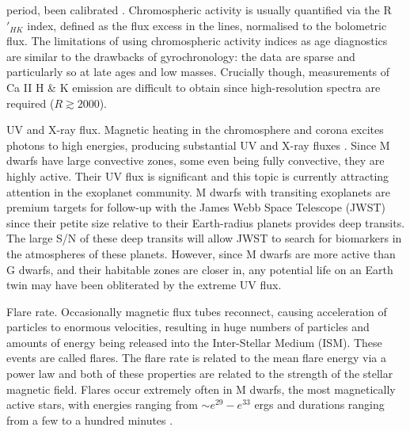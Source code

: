 \begin{itemize}
{{period, been calibrated \citep[\eg][]{Soderblom1991, Donahue1993,
Lachaume1999, Mamajek2008}.
Chromospheric activity is usually quantified via the R$\prime_{HK}$ index,
defined as the flux excess in the lines, normalised to the bolometric flux.
The limitations of using chromospheric activity indices as age diagnostics are
similar to the drawbacks of gyrochronology: the data are sparse and
particularly so at late ages and low masses.
Crucially though, measurements of Ca II H \& K emission are difficult to
obtain since high-resolution spectra are required ($R\gtrsim2000$).
}
\item{UV and X-ray flux.}
Magnetic heating in the chromosphere and corona excites photons to high
energies, producing substantial UV and X-ray fluxes
\citep[\eg][]{Pallavicini1981}.
Since M dwarfs have large convective zones, some even being fully convective,
they are highly active.
Their UV flux is significant and this topic is currently attracting attention
in the exoplanet community.
M dwarfs with transiting exoplanets are premium targets for follow-up with the
James Webb Space Telescope (JWST) since their petite size relative to their
Earth-radius planets provides deep transits.
The large S/N of these deep transits will allow JWST to search for biomarkers
in the atmospheres of these planets.
However, since M dwarfs are more active than G dwarfs, and their habitable
zones are closer in, any potential life on an Earth twin may have been
obliterated by the extreme UV flux.}
\item{Flare rate.
Occasionally magnetic flux tubes reconnect, causing acceleration of particles
to enormous velocities, resulting in huge numbers of particles and amounts of
energy being released into the Inter-Stellar Medium (ISM).
These events are called flares.
The flare rate is related to the mean flare energy via a power law
\citep{Hawley2014, Davenport2015} and both of these properties are related to
the strength of the stellar magnetic field.
Flares occur extremely often in M dwarfs, the most magnetically active stars,
with energies ranging from $\sim e^{29} - e^{33}$ ergs and durations ranging
from a few to a hundred minutes \citep{Hawley2014}.}
\end{itemize}

